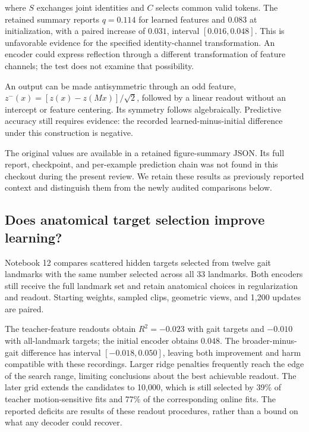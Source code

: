 \documentclass{article}
\begin{document}
where \(S\) exchanges joint identities and \(C\) selects common valid tokens. The retained summary reports \(q=0.114\) for learned features and \(0.083\) at initialization, with a paired increase of \(0.031\), interval \([0.016,0.048]\). This is unfavorable evidence for the specified identity-channel transformation. An encoder could express reflection through a different transformation of feature channels; the test does not examine that possibility.

An output can be made antisymmetric through an odd feature, \(z^-(x)=[z(x)-z(Mx)]/\sqrt{2}\), followed by a linear readout without an intercept or feature centering. Its symmetry follows algebraically. Predictive accuracy still requires evidence: the recorded learned-minus-initial difference under this construction is negative.

The original values are available in a retained figure-summary JSON. Its full report, checkpoint, and per-example prediction chain was not found in this checkout during the present review. We retain these results as previously reported context and distinguish them from the newly audited comparisons below.

\subsection{Does anatomical target selection improve learning?}\label{does-anatomical-target-selection-improve-learning}

Notebook 12 compares scattered hidden targets selected from twelve gait landmarks with the same number selected across all 33 landmarks. Both encoders still receive the full landmark set and retain anatomical choices in regularization and readout. Starting weights, sampled clips, geometric views, and 1,200 updates are paired.

The teacher-feature readouts obtain \(R^2=-0.023\) with gait targets and \(-0.010\) with all-landmark targets; the initial encoder obtains \(0.048\). The broader-minus-gait difference has interval \([-0.018,0.050]\), leaving both improvement and harm compatible with these recordings. Larger ridge penalties frequently reach the edge of the search range, limiting conclusions about the best achievable readout. The later grid extends the candidates to 10,000, which is still selected by 39\% of teacher motion-sensitive fits and 77\% of the corresponding online fits. The reported deficits are results of these readout procedures, rather than a bound on what any decoder could recover.
\end{document}
